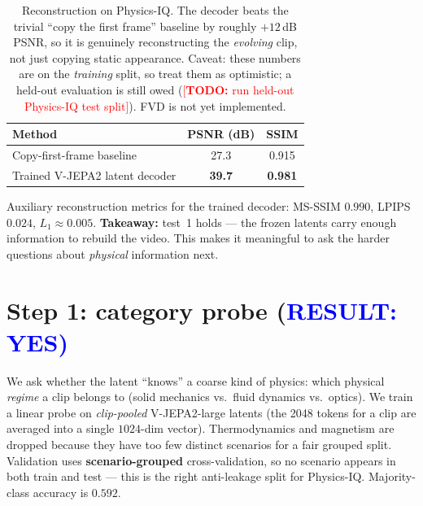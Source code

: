\documentclass{article} %
\newcommand{\vjepa}{V-JEPA2}
\newcommand{\todo}[1]{\textcolor{red}{[\textbf{TODO:} #1]}}
\begin{document}
\begin{table}[h]
\caption{Reconstruction on Physics-IQ. The decoder beats the trivial ``copy the first frame'' baseline
by roughly $+12$\,dB PSNR, so it is genuinely reconstructing the \emph{evolving} clip, not just copying
static appearance. Caveat: these numbers are on the \emph{training} split, so treat them as optimistic;
a held-out evaluation is still owed (\todo{run held-out Physics-IQ test split}). FVD is not yet
implemented.}
\label{tab:recon}
\begin{center}
\begin{tabular}{lcc}
\toprule
\textbf{Method} & \textbf{PSNR (dB)} & \textbf{SSIM} \\
\midrule
Copy-first-frame baseline      & 27.3  & 0.915 \\
Trained \vjepa{} latent decoder & \textbf{39.7} & \textbf{0.981} \\
\bottomrule
\end{tabular}
\end{center}
\end{table}

Auxiliary reconstruction metrics for the trained decoder: MS-SSIM $0.990$, LPIPS $0.024$, $L_1
\approx 0.005$. \textbf{Takeaway:} test~1 holds --- the frozen latents carry enough information to
rebuild the video. This makes it meaningful to ask the harder questions about \emph{physical}
information next.

\section{Step 1: category probe (\textcolor{blue}{RESULT: YES)}}
\label{sec:step1}

We ask whether the latent ``knows'' a coarse kind of physics: which physical \emph{regime} a clip
belongs to (solid mechanics vs.\ fluid dynamics vs.\ optics). We train a linear probe on
\emph{clip-pooled} \vjepa{}-large latents (the 2048 tokens for a clip are averaged into a single
$1024$-dim vector). Thermodynamics and magnetism are dropped because they have too few distinct
scenarios for a fair grouped split. Validation uses \textbf{scenario-grouped} cross-validation, so no
scenario appears in both train and test --- this is the right anti-leakage split for Physics-IQ.
Majority-class accuracy is $0.592$.
\end{document}
